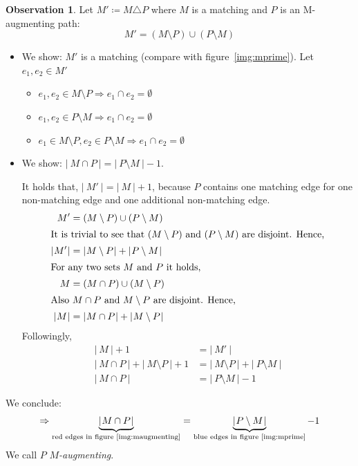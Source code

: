 \documentclass[a4paper]{article}
\theoremstyle{definition}
\newtheorem{observation}[theorem]{Observation}
\newcommand{\card}[1]{\left|\:\!#1\:\!\right|}
\begin{document}
\begin{observation}
  Let $M' \coloneqq M \triangle P$ where $M$ is a matching and $P$ is an M-augmenting path:
  \[ M' = (M \setminus P) \cup (P \setminus M) \]
  \begin{itemize}
    \item We show: $M'$ is a matching (compare with figure~\ref{img:mprime}).
      Let $e_1, e_2 \in M'$
      \begin{itemize}
        \item $e_1, e_2 \in M \setminus P \Rightarrow e_1 \cap e_2 = \emptyset$
        \item $e_1, e_2 \in P \setminus M \Rightarrow e_1 \cap e_2 = \emptyset$
        \item $e_1 \in M \setminus P, e_2 \in P \setminus M \Rightarrow e_1 \cap e_2 = \emptyset$
      \end{itemize}

    \item We show: $\card{M \cap P} = \card{P \setminus M} - 1$.

      It holds that, $\card{M'} = \card{M} + 1$, because $P$ contains one matching edge
      for one non-matching edge and one additional non-matching edge.
      \begin{align*}
               M' &= (M \setminus P) \cup (P \setminus M) \\
      \intertext{It is trivial to see that $(M \setminus P)$ and $(P \setminus M)$ are disjoint. Hence,}
        \card{M'} &= \card{M \setminus P} + \card{P \setminus M} \\
      \intertext{For any two sets $M$ and $P$ it holds,}
                M &= (M \cap P) \cup (M \setminus P) \\
      \intertext{Also $M \cap P$ and $M \setminus P$ are disjoint. Hence,}
         \card{M} &= \card{M \cap P} + \card{M \setminus P}
      \end{align*}
      Followingly,
      \begin{align*}
        \card{M} + 1 &= \card{M'} \\
        \card{M \cap P} + \card{M \setminus P} + 1 &= \card{M \setminus P} + \card{P \setminus M} \\
        \card{M \cap P} &= \card{P \setminus M} - 1
      \end{align*}
  \end{itemize}

  We conclude:
  \[
    \Rightarrow
    \underbrace{\card{M \cap P}}_{\text{red edges in figure~\ref{img:maugmenting}}} =
    \underbrace{\card{P \setminus M}}_{\text{blue edges in figure~\ref{img:mprime}}} - 1
  \]
  We call $P$ \emph{$M$-augmenting}.
\end{observation}
\end{document}
